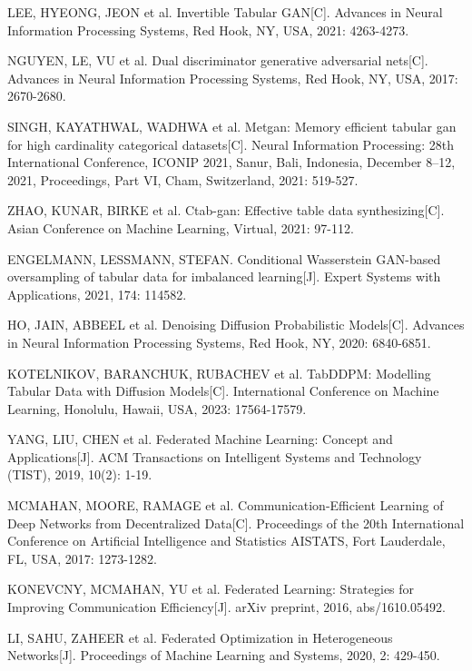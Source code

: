 \begin{thebibliography}{200}
	LEE, HYEONG, JEON et al. Invertible Tabular GAN[C]. Advances in Neural Information Processing Systems, Red Hook, NY, USA, 2021: 4263-4273.
	
	NGUYEN, LE, VU et al. Dual discriminator generative adversarial nets[C]. Advances in Neural Information Processing Systems, Red Hook, NY, USA, 2017: 2670-2680.
	
	SINGH, KAYATHWAL, WADHWA et al. Metgan: Memory efficient tabular gan for high cardinality categorical datasets[C]. Neural Information Processing: 28th International Conference, ICONIP 2021, Sanur, Bali, Indonesia, December 8--12, 2021, Proceedings, Part VI, Cham, Switzerland, 2021: 519-527.
	
	ZHAO, KUNAR, BIRKE et al. Ctab-gan: Effective table data synthesizing[C]. Asian Conference on Machine Learning, Virtual, 2021: 97-112.
	
	ENGELMANN, LESSMANN, STEFAN. Conditional Wasserstein GAN-based oversampling of tabular data for imbalanced learning[J]. Expert Systems with Applications, 2021, 174: 114582.
	
	HO, JAIN, ABBEEL et al. Denoising Diffusion Probabilistic Models[C]. Advances in Neural Information Processing Systems, Red Hook, NY, 2020: 6840-6851.
	
	KOTELNIKOV, BARANCHUK, RUBACHEV et al. TabDDPM: Modelling Tabular Data with Diffusion Models[C]. International Conference on Machine Learning, Honolulu, Hawaii, USA, 2023: 17564-17579.
	
	YANG, LIU, CHEN et al. Federated Machine Learning: Concept and Applications[J]. ACM Transactions on Intelligent Systems and Technology (TIST), 2019, 10(2): 1-19.
	
	MCMAHAN, MOORE, RAMAGE et al. Communication-Efficient Learning of Deep Networks from Decentralized Data[C]. Proceedings of the 20th International Conference on Artificial Intelligence and Statistics AISTATS, Fort Lauderdale, FL, USA, 2017: 1273-1282.
	
	KONEVCNY, MCMAHAN, YU et al. Federated Learning: Strategies for Improving Communication Efficiency[J]. arXiv preprint, 2016, abs/1610.05492.
	
	LI, SAHU, ZAHEER et al. Federated Optimization in Heterogeneous Networks[J]. Proceedings of Machine Learning and Systems, 2020, 2: 429-450.
	

\end{thebibliography}

